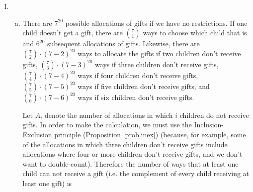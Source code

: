 \begin{enumerate}[(I)]

\item

\begin{enumerate}[(a)]

\item


%

There are \(7^{20}\) possible allocations of gifts if we have no restrictions. If one child doesn't get a gift, there are \(\binom{7}{1}\) ways to choose which child that is and \(6^{20}\) subsequent allocations of gifts. Likewise, there are \(\binom{7}{2} \cdot (7-2)^{20}\) ways to allocate the gifts if two children don't receive gifts,  \(\binom{7}{3} \cdot (7-3)^{20}\) ways if three children don't receive gifts, \(\binom{7}{4} \cdot (7-4)^{20}\) ways if four children don't receive gifts, \(\binom{7}{5} \cdot (7-5)^{20}\) ways if five children don't receive gifts, and \(\binom{7}{6} \cdot (7-6)^{20}\) ways if six children don't receive gifts. 

Let \(A_i\) denote the number of allocations in which \(i\) children do not receive gifts. In order to make the calculation, we must use the Inclusion-Exclusion principle (Proposition \ref{prob.inex}) (because, for example, some of the allocations in which three children don't receive gifts include allocations where four or more children don't receive gifts, and we don't want to double-count). Therefore the number of ways that at least one child can not receive a gift (i.e. the complement of every child receiving at least one gift) is


\end{enumerate}
\end{enumerate}
